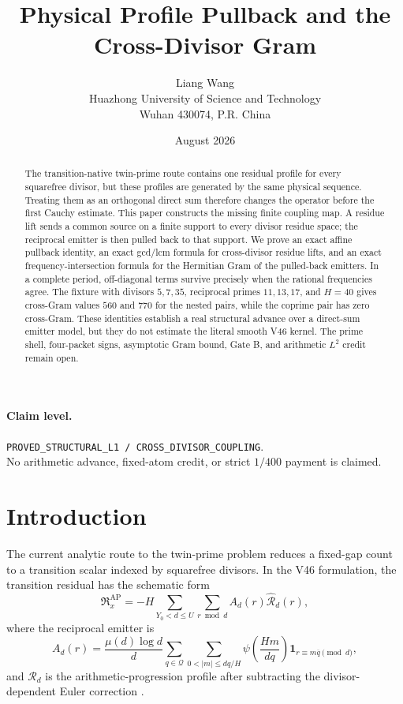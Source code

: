 \documentclass[11pt]{article}
\title{\textbf{Physical Profile Pullback and the Cross-Divisor Gram}}
\author{Liang Wang\\
Huazhong University of Science and Technology\\
Wuhan 430074, P.R. China}
\date{August 2026}
\theoremstyle{definition}
\theoremstyle{remark}
\newcommand{\one}{\mathbf 1}
\newcommand{\muM}{\mu}
\begin{document}
\maketitle

\begin{abstract}
The transition-native twin-prime route contains one residual profile for every
squarefree divisor, but these profiles are generated by the same physical
sequence.  Treating them as an orthogonal direct sum therefore changes the
operator before the first Cauchy estimate.  This paper constructs the missing
finite coupling map.  A residue lift sends a common source on a finite support
to every divisor residue space; the reciprocal emitter is then pulled back to
that support.  We prove an exact affine pullback identity, an exact gcd/lcm
formula for cross-divisor residue lifts, and an exact frequency-intersection
formula for the Hermitian Gram of the pulled-back emitters.  In a complete
period, off-diagonal terms survive precisely when the rational frequencies
agree.  The fixture with divisors $5,7,35$, reciprocal primes $11,13,17$, and
$H=40$ gives cross-Gram values $560$ and $770$ for the nested pairs, while the
coprime pair has zero cross-Gram.  These identities establish a real structural
advance over a direct-sum emitter model, but they do not estimate the literal
smooth V46 kernel.  The prime shell, four-packet signs, asymptotic Gram bound,
Gate B, and arithmetic $L^2$ credit remain open.
\end{abstract}

\paragraph{Claim level.}
\texttt{PROVED\_STRUCTURAL\_L1 / CROSS\_DIVISOR\_COUPLING}.\\
No arithmetic advance, fixed-atom credit, or strict $1/400$ payment is claimed.

\section{Introduction}

The current analytic route to the twin-prime problem reduces a fixed-gap count
to a transition scalar indexed by squarefree divisors.  In the V46 formulation,
the transition residual has the schematic form
\begin{equation}
 \mathfrak R_x^{\mathrm{AP}}
 =-H\sum_{Y_0<d\leq U}\sum_{r\bmod d}
 A_d(r)\widehat{\mathcal R}_d(r),
 \label{eq:v46}
\end{equation}
where the reciprocal emitter is
\begin{equation}
 A_d(r)=\frac{\muM(d)\log d}{d}
 \sum_{q\in\mathcal Q}\sum_{0<|m|\leq dq/H}
 \psi\!\left(\frac{Hm}{dq}\right)
 \one_{r\equiv m\overline q\pmod d},
 \label{eq:emitter}
\end{equation}
and $\mathcal R_d$ is the arithmetic-progression profile after subtracting
the divisor-dependent Euler correction \cite{WangV46}.
\end{document}
